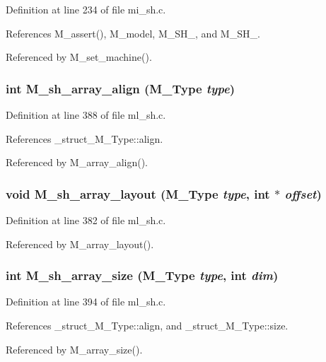 Definition at line 234 of file mi\_\-sh.c.

References M\_\-assert(), M\_\-model, M\_\-SH\_, and M\_\-SH\_.

Referenced by M\_\-set\_\-machine().
\subsubsection{\setlength{\rightskip}{0pt plus 5cm}int M\_\-sh\_\-array\_\-align (\bf{M\_\-Type} {\em type})}\label{m__sh_8h_39abd95c38c7c922d1032828df4eca7c}




Definition at line 388 of file ml\_\-sh.c.

References \_\-struct\_\-M\_\-Type::align.

Referenced by M\_\-array\_\-align().
\subsubsection{\setlength{\rightskip}{0pt plus 5cm}void M\_\-sh\_\-array\_\-layout (\bf{M\_\-Type} {\em type}, int $\ast$ {\em offset})}\label{m__sh_8h_95f29e34821a94e543b2e09572eb90cd}




Definition at line 382 of file ml\_\-sh.c.

Referenced by M\_\-array\_\-layout().
\subsubsection{\setlength{\rightskip}{0pt plus 5cm}int M\_\-sh\_\-array\_\-size (\bf{M\_\-Type} {\em type}, int {\em dim})}\label{m__sh_8h_f2e85f083ef84514b3728d9daab2af20}




Definition at line 394 of file ml\_\-sh.c.

References \_\-struct\_\-M\_\-Type::align, and \_\-struct\_\-M\_\-Type::size.

Referenced by M\_\-array\_\-size().
